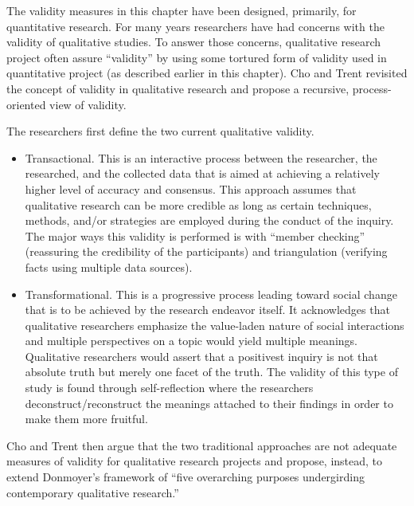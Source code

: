 The validity measures in this chapter have been designed, primarily, for quantitative research. For many years researchers have had concerns with the validity of qualitative studies. To answer those concerns, qualitative research project often assure ``validity'' by using some tortured form of validity used in quantitative project (as described earlier in this chapter). Cho and Trent revisited the concept of validity in qualitative research and propose a recursive, process-oriented view of validity\cite{cho2006validity}.

The researchers first define the two current qualitative validity.

\begin{itemize}
	\item Transactional. This is an interactive process between the researcher, the researched, and the collected data that is aimed at achieving a relatively higher level of accuracy and consensus. This approach assumes that qualitative research can be more credible as long as certain techniques, methods, and/or strategies are employed during the conduct of the inquiry. The major ways this validity is performed is with ``member checking'' (reassuring the credibility of the participants) and triangulation (verifying facts using multiple data sources).
	\item Transformational. This is a progressive process leading toward social change that is to be achieved by the research endeavor itself. It acknowledges that qualitative researchers emphasize the value-laden nature of social interactions and multiple perspectives on a topic would yield multiple meanings. Qualitative researchers would assert that a positivest inquiry is not that absolute truth but merely one facet of the truth. The validity of this type of study is found through self-reflection where the researchers deconstruct/reconstruct the meanings attached to their findings in order to make them more fruitful. 
\end{itemize}

Cho and Trent then argue that the two traditional approaches are not adequate measures of validity for qualitative research projects and propose, instead, to extend Donmoyer's framework of ``five overarching purposes undergirding contemporary qualitative research.''\cite{donmoyer2001paradigm} 


